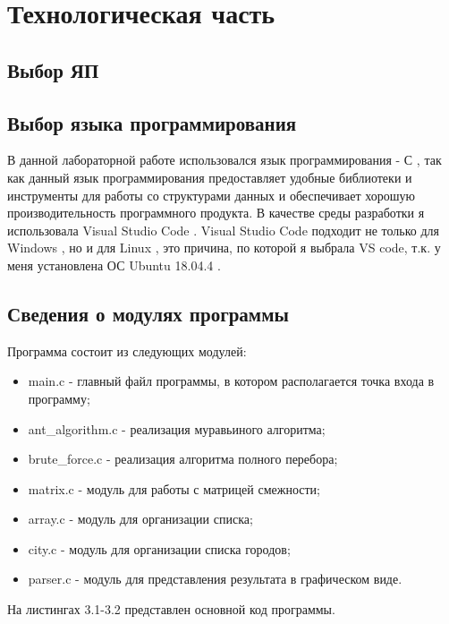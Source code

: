 \chapter{Технологическая часть}

\section{Выбор ЯП}

\section{Выбор языка программирования}
В данной лабораторной работе использовался язык программирования - С  \cite{Microsoft},
так как данный язык программирования предоставляет удобные библиотеки и инструменты для
работы со структурами данных и обеспечивает хорошую производительность программного продукта.
В качестве среды разработки я использовала Visual Studio Code \cite{Vs}.
Visual Studio Code подходит не только для  Windows \cite{Win},
но и для Linux \cite{Lin}, это причина,
по которой я выбрала VS code,
т.к. у меня установлена ОС Ubuntu 18.04.4 \cite{Ubuntu}.

\section{Сведения о модулях программы}

Программа состоит из следующих модулей:

\begin{itemize}
	\item main.c - главный файл программы, в котором располагается точка входа в программу;
	\item ant\_algorithm.c - реализация муравьиного алгоритма;
	\item brute\_force.c - реализация алгоритма полного перебора;
	\item matrix.c - модуль для работы с матрицей смежности;
	\item array.c - модуль для организации списка;
	\item city.c - модуль для организации списка городов;
	\item parser.c - модуль для представления результата в графическом виде.
\end{itemize}

На листингах 3.1-3.2 представлен основной код программы.

